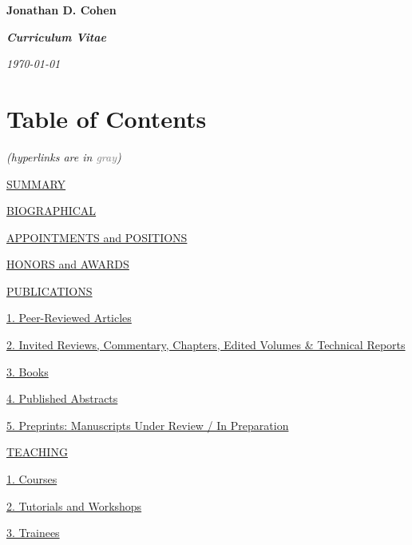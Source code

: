 \documentclass[10 pt]{article}
\begin{document}
\thispagestyle{empty} %

    \begin{center}
{\fontsize{15pt}{16 pt}\selectfont \textbf{Jonathan D. Cohen}}

{\fontsize{14pt}{16 pt}\selectfont \textit{\textbf{Curriculum Vitae}}}

    \medskip
    \textit{\today}
    \bigskip

\section*{Table of Contents} \label{secTOC}
    \vspace{-8pt}
    \emph{(hyperlinks are in \textcolor{gray}{gray})}
    \end{center}
    \medskip

\hyperref[secSUMMARY]{SUMMARY}
    \medskip

\hyperref[secBIOGRAPHICAL]{BIOGRAPHICAL}
    \medskip

\hyperref[secAaP]{APPOINTMENTS and POSITIONS}
    \medskip

\hyperref[secHaA]{HONORS and AWARDS}
    \medskip

\hyperref[secPUBLICATIONS]{PUBLICATIONS}
    \medskip

\hyperref[secPUBLICATIONS1]{\hspace{0.4in} 1. Peer-Reviewed Articles}

\hyperref[secPUBLICATIONS2]{\hspace{0.4in} 2. Invited Reviews, Commentary, Chapters, Edited Volumes \& Technical Reports}

\hyperref[secPUBLICATIONS3]{\hspace{0.4in} 3. Books}

\hyperref[secPUBLICATIONS4]{\hspace{0.4in} 4. Published Abstracts}

\hyperref[secPUBLICATIONS5]{\hspace{0.4in} 5. Preprints: Manuscripts Under Review / In Preparation}
    \medskip

\hyperref[secTEACHING]{TEACHING}

\hyperref[secTEACHING1]{\hspace{0.4in} 1. Courses}

\hyperref[secTEACHING2]{\hspace{0.4in} 2. Tutorials and Workshops}

\hyperref[secTEACHING3]{\hspace{0.4in} 3. Trainees}
    \medskip
\end{document}

